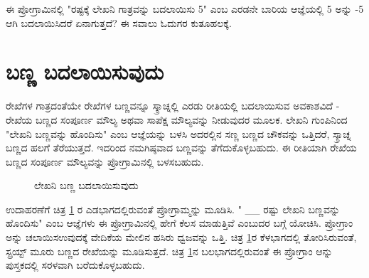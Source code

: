 ಈ ಪ್ರೋಗ್ರಾಮಿನಲ್ಲಿ "ರಷ್ಟಕ್ಕೆ ಲೇಖನಿ ಗಾತ್ರವನ್ನು ಬದಲಾಯಿಸು 5" ಎಂಬ ಎರಡನೇ ಬಾರಿಯ  ಆಜ್ಞೆಯಲ್ಲಿ 5 ಅನ್ನು -5 ಆಗಿ ಬದಲಾಯಿಸಿದರೆ ಏನಾಗುತ್ತದೆ? ಈ ಸವಾಲು ಓದುಗರ ಕುತೂಹಲಕ್ಕೆ. 

\section{ಬಣ್ಣ ಬದಲಾಯಿಸುವುದು}
ರೇಖೆಗಳ ಗಾತ್ರದಂತೆಯೇ ರೇಖೆಗಳ ಬಣ್ಣವನ್ನೂ ಸ್ಕ್ರಾಚ್ನಲ್ಲಿ ಎರಡು ರೀತಿಯಲ್ಲಿ  ಬದಲಾಯಿಸುವ ಅವಕಾಶವಿದೆ - ರೇಖೆಯ ಬಣ್ಣದ ಸಂಪೂರ್ಣ ಮೌಲ್ಯ ಅಥವಾ ಸಾಪೆಕ್ಷ ಮೌಲ್ಯವನ್ನು ನೀಡುವುದರ ಮೂಲಕ.  ಲೇಖನಿ ಗುಂಪಿನಿಂದ "ಲೇಖನಿ ಬಣ್ಣವನ್ನು ಹೊಂದಿಸು" ಎಂಬ ಆಜ್ಞೆಯನ್ನು ಬಳಸಿ ಅದರಲ್ಲಿನ ಸಣ್ಣ ಬಣ್ಣದ ಚೌಕವನ್ನು ಒತ್ತಿದರೆ, ಸ್ಕ್ರಾಚ್ನ ಬಣ್ಣದ ಹಲಗೆ ತೆರೆಯುತ್ತದೆ. ಇದರಿಂದ ನಮಗಿಷ್ಠವಾದ ಬಣ್ಣವನ್ನು ತೆಗೆದುಕೊಳ್ಳಬಹುದು.  ಈ ರೀತಿಯಾಗಿ ರೇಖೆಯ ಬಣ್ಣದ ಸಂಪೂರ್ಣ ಮೌಲ್ಯವನ್ನು ಪ್ರೋಗ್ರಾಮಿನಲ್ಲಿ ಬಳಸಬಹುದು.

\begin{figure}[h]
\begin{center}
\begin{multicols}{2}
\begin{Scratch}[1]
\beginbox{}
\end{Scratch}


\end{multicols}
\vspace{1cm}
\end{center}
\caption{ಲೇಖನಿ ಬಣ್ಣ ಬದಲಾಯಿಸುವುದು}
\label{pen_color}
\end{figure}
ಉದಾಹರಣೆಗೆ ಚಿತ್ರ \ref{pen_color} ರ ಎಡಭಾಗದಲ್ಲಿರುವಂತೆ ಪ್ರೋಗ್ರಾಮ್ಮನ್ನು ಮೂಡಿಸಿ.  " \_\_ ರಷ್ಟು ಲೇಖನಿ ಬಣ್ಣವನ್ನು ಹೊಂದಿಸು" ಎಂಬ  ಆಜ್ಞೆಗಳು ಈ ಪ್ರೋಗ್ರಾಮಿನಲ್ಲಿ ಹೇಗೆ ಕೆಲಸ ಮಾಡುತ್ತಿವೆ ಎಂಬುದರ ಬಗ್ಗೆ ಯೋಚಿಸಿ.  ಪ್ರೋಗ್ರಾಂ ಅನ್ನು  ಚಲಾಯಿಸಉವುದಕ್ಕೆ ವೇದಿಕೆಯ ಮೇಲಿನ ಹಸಿರು ಧ್ವಜವನ್ನು ಒತ್ತಿ.  ಚಿತ್ರ \ref{pen_color}ರ ಕೆಳಭಾಗದಲ್ಲಿ ತೋರಿಸಿರುವಂತೆ, ಸ್ಪ್ರಯ್ಟ್ ಮೂರು ಬಣ್ಣದ ರೇಖೆಯನ್ನು ಮೂಡಿಸುತ್ತದೆ.  ಚಿತ್ರ \ref{pen_color}ನ ಬಲಭಾಗದಲ್ಲಿರುವಂತೆ  ಈ ಪ್ರೋಗ್ರಾಂ ಆನ್ನು ಪುಸ್ತಕದಲ್ಲಿ  ಸರಳವಾಗಿ ಬರೆದುಕೊಳ್ಳಬಹುದು.  


